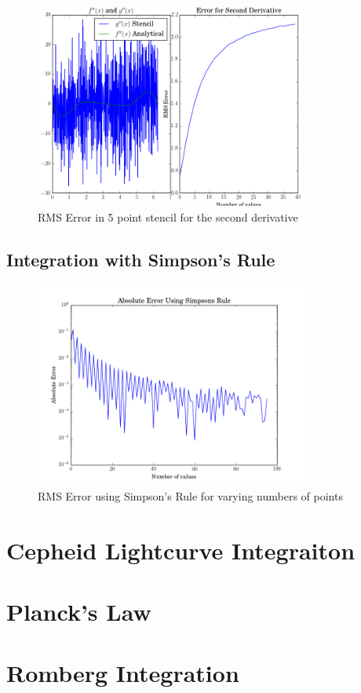 \documentclass[12pt]{article}
\begin{document}
  \begin{figure}[h!]
    \centering
    \includegraphics[width=0.8\textwidth]{Problem2ib.png}
    \caption{RMS Error in 5 point stencil for the second derivative}
  \end{figure}

  \subsection{Integration with Simpson's Rule}
  
  \begin{figure}[h!]
    \centering
    \includegraphics[width=0.8\textwidth]{Problem2ii.png}
    \caption{RMS Error using Simpson's Rule for varying numbers of points}
  \end{figure}

  \section{Cepheid Lightcurve Integraiton}

  \section{Planck's Law}

  \section{Romberg Integration}
\end{document}

